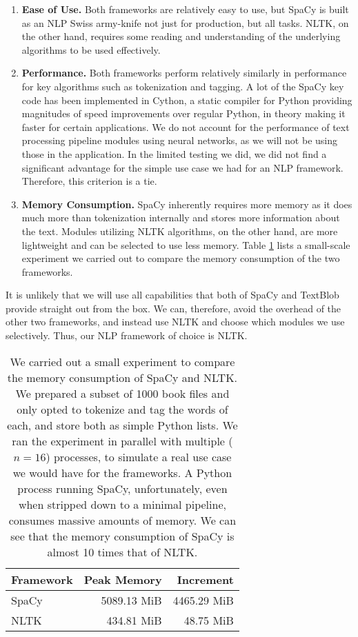\begin{enumerate}
    \item \textbf{Ease of Use.} Both frameworks are relatively easy to use, but SpaCy is built as an NLP Swiss army-knife not just for production, but all tasks. NLTK, on the other hand, requires some reading and understanding of the underlying algorithms to be used effectively.
    \item \textbf{Performance.} Both frameworks perform relatively similarly in performance for key algorithms such as tokenization and tagging. A lot of the SpaCy key code has been implemented in Cython, a static compiler for Python providing magnitudes of speed improvements over regular Python, in theory making it faster for certain applications. We do not account for the performance of text processing pipeline modules using neural networks, as we will not be using those in the application. In the limited testing we did, we did not find a significant advantage for the simple use case we had for an NLP framework. Therefore, this criterion is a tie. 
    \item \textbf{Memory Consumption.} SpaCy inherently requires more memory as it does much more than tokenization internally and stores more information about the text. Modules utilizing NLTK algorithms, on the other hand, are more lightweight and can be selected to use less memory. Table \ref{tab:spacy_vs_nltk} lists a small-scale experiment we carried out to compare the memory consumption of the two frameworks.
\end{enumerate}

It is unlikely that we will use all capabilities that both of SpaCy and TextBlob provide straight out from the box. We can, therefore, avoid the overhead of the other two frameworks, and instead use NLTK and choose which modules we use selectively. Thus, our NLP framework of choice is NLTK.

\begin{table}[htbp]
    \centering
        \begin{tabular}{lrr}
            \toprule
            Framework  &  Peak Memory  &     Increment \\
            \midrule
                SpaCy  &  5089.13 MiB  &   4465.29 MiB \\
                NLTK &  434.81 MiB   &     48.75 MiB \\
            \bottomrule
            \end{tabular}
    \caption{We carried out a small experiment to compare the memory consumption of SpaCy and NLTK. We prepared a subset of 1000 book files and only opted to tokenize and tag the words of each, and store both as simple Python lists. We ran the experiment in parallel with multiple ($n=16$) processes, to simulate a real use case we would have for the frameworks. A Python process running SpaCy, unfortunately, even when stripped down to a minimal pipeline, consumes massive amounts of memory. We can see that the memory consumption of SpaCy is almost 10 times that of NLTK. }
    \label{tab:spacy_vs_nltk}
\end{table}


